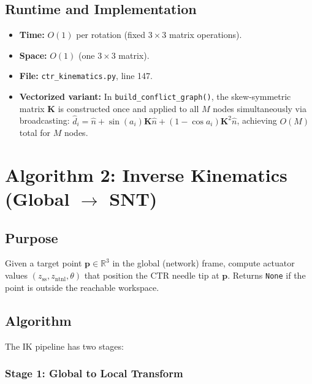 \documentclass[11pt,a4paper]{article}
\newcommand{\Oh}[1]{$O(#1)$}
\newcommand{\filename}[1]{\texttt{\textcolor{accentblue}{#1}}}
\newcommand{\funcname}[1]{\texttt{\textcolor{codepurple}{#1}}}
\begin{document}
\subsection{Runtime and Implementation}

\begin{itemize}[nosep]
    \item \textbf{Time:} \Oh{1} per rotation (fixed $3 \times 3$ matrix operations).
    \item \textbf{Space:} \Oh{1} (one $3 \times 3$ matrix).
    \item \textbf{File:} \filename{ctr\_kinematics.py}, line 147.
    \item \textbf{Vectorized variant:} In \funcname{build\_conflict\_graph()}, the skew-symmetric matrix $\mathbf{K}$ is constructed once and applied to all $M$ nodes simultaneously via broadcasting: $\hat{d}_i = \hat{n} + \sin(a_i) \mathbf{K}\hat{n} + (1 - \cos a_i) \mathbf{K}^2\hat{n}$, achieving \Oh{M} total for $M$ nodes.
\end{itemize}


\section{Algorithm 2: Inverse Kinematics (Global $\to$ SNT)}
\label{sec:ik}

\subsection{Purpose}

Given a target point $\mathbf{p} \in \mathbb{R}^3$ in the global (network) frame, compute actuator values $(z_\text{ss}, z_\text{ntnl}, \theta)$ that position the CTR needle tip at $\mathbf{p}$. Returns \texttt{None} if the point is outside the reachable workspace.

\subsection{Algorithm}

The IK pipeline has two stages:

\subsubsection{Stage 1: Global to Local Transform}
\end{document}

